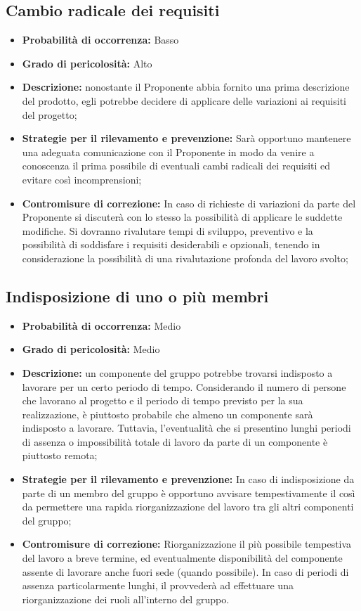 \subsection{Cambio radicale dei requisiti}
\begin{itemize}
\item \textbf{Probabilità di occorrenza:} Basso
\item \textbf{Grado di pericolosità:} Alto
\item \textbf{Descrizione:} nonostante il Proponente abbia fornito una prima descrizione del prodotto, egli potrebbe decidere di applicare delle variazioni ai requisiti del progetto;
\item \textbf{Strategie per il rilevamento e prevenzione:} Sarà opportuno mantenere una adeguata comunicazione con il Proponente in modo da venire a conoscenza il prima possibile di eventuali cambi radicali dei requisiti ed evitare così incomprensioni;
\item \textbf{Contromisure di correzione:} In caso di richieste di variazioni da parte del Proponente si discuterà con lo stesso la possibilità di applicare le suddette modifiche. Si dovranno rivalutare tempi di sviluppo, preventivo e la possibilità di soddisfare i requisiti desiderabili e opzionali, tenendo in considerazione la possibilità di una rivalutazione profonda del lavoro svolto;
\end{itemize}

\subsection{Indisposizione di uno o più membri}
\begin{itemize}
\item \textbf{Probabilità di occorrenza:} Medio
\item \textbf{Grado di pericolosità:} Medio
\item \textbf{Descrizione:} un componente del gruppo potrebbe trovarsi indisposto a lavorare per un certo periodo di tempo. Considerando il numero di persone che lavorano al progetto  e il periodo di tempo previsto per la sua realizzazione, è piuttosto probabile che almeno un componente sarà indisposto a lavorare. Tuttavia, l'eventualità che si presentino lunghi periodi di assenza o impossibilità totale di lavoro da parte di un componente è piuttosto remota;
\item \textbf{Strategie per il rilevamento e prevenzione:} In caso di indisposizione da parte di un membro del gruppo è opportuno avvisare tempestivamente il \ruoloResponsabile  così da permettere una rapida riorganizzazione del lavoro tra gli altri componenti del gruppo;
\item \textbf{Contromisure di correzione:} Riorganizzazione il più possibile tempestiva del lavoro a breve termine, ed eventualmente disponibilità del componente assente di lavorare anche fuori sede (quando possibile). In caso di periodi di assenza particolarmente lunghi, il \ruoloResponsabile provvederà ad effettuare una riorganizzazione dei ruoli all'interno del gruppo.
\end{itemize}

